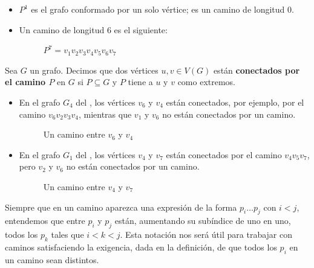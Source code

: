 \begin{Ejm}
   \phantom{o}
   \begin{itemize}
      \item $P^1$ es el grafo conformado por un solo vértice; es un camino de longitud $0$.
      \item Un camino de longitud $6$ es el siguiente:
      \begin{figure}[H]
        \centering
          \resizebox{0.3\textwidth}{!}{}
        \caption{$P^7=v_1v_2v_3v_4v_5v_6v_7$}
      \end{figure}
   \end{itemize}
\end{Ejm}
\begin{Def}
   Sea $G$ un grafo. Decimos que dos vértices $u,v\in V(G)$ están \textbf{conectados por el camino $P$} en $G$ si $P\subseteq G$ y $P$ tiene a $u$ y $v$ como extremos.
\end{Def}
\begin{Ejm}
   \phantom{o}
   \begin{itemize}
      \item En el grafo $G_4$ del , los vértices $v_6$ y $v_4$ están conectados, por ejemplo, por el camino $v_6v_2v_3v_4$, mientras que $v_1$ y $v_6$ no están conectados por un camino.
      \begin{figure}[H]
        \centering
          \resizebox{0.2\textwidth}{!}{}
        \caption{Un camino entre $v_6$ y $v_4$}
      \end{figure}
      \item En el grafo $G_1$ del , los vértices $v_4$ y $v_7$ están conectados por el camino $v_4v_5v_7$, pero $v_2$ y $v_6$ no están conectados por un camino.
      \begin{figure}[H]
        \centering
          \resizebox{0.3\textwidth}{!}{}
        \caption{Un camino entre $v_4$ y $v_7$}
      \end{figure}
   \end{itemize}
\end{Ejm}
\begin{Not}
   Siempre que en un camino aparezca una expresión de la forma $p_i\dots p_j$ con $i<j$, entendemos que entre $p_i$ y $p_j$ están, aumentando su subíndice de uno en uno, todos los $p_k$ tales que $i<k<j$. Esta notación nos será útil para trabajar con caminos satisfaciendo la exigencia, dada en la definición, de que todos los $p_i$ en un camino sean distintos.
\end{Not}
